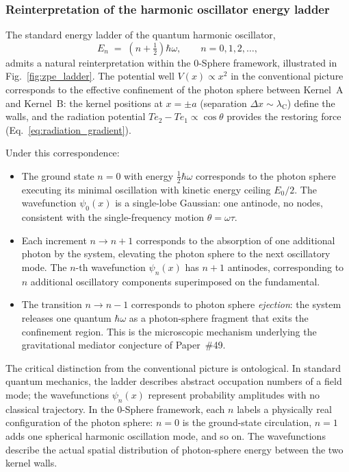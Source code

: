 \documentclass[%
 reprint,
 amsmath,amssymb,
 aps,
 prb,
]{revtex4-2}
\numberwithin{equation}{section}
\theoremstyle{definition}
\theoremstyle{remark}
\newcommand{\lambdaC}{\lambda_{\text{C}}}  %
\begin{document}
\subsubsection{Reinterpretation of the harmonic oscillator energy ladder}

The standard energy ladder of the quantum harmonic oscillator,
\begin{equation}
E_n \;=\; \left(n + \tfrac{1}{2}\right)\hbar\omega, \qquad n = 0, 1, 2, \ldots,
\label{eq:energy_ladder}
\end{equation}
admits a natural reinterpretation within the 0-Sphere framework, illustrated in Fig.~\ref{fig:zpe_ladder}. The potential well $V(x) \propto x^2$ in the conventional picture corresponds to the effective confinement of the photon sphere between Kernel~A and Kernel~B: the kernel positions at $x = \pm a$ (separation $\Delta x \sim \lambdaC$) define the walls, and the radiation potential $Te_2 - Te_1 \propto \cos\theta$ provides the restoring force (Eq.~\ref{eq:radiation_gradient}).

Under this correspondence:
\begin{itemize}
\item The ground state $n = 0$ with energy $\frac{1}{2}\hbar\omega$ corresponds to the photon sphere executing its minimal oscillation with kinetic energy ceiling $E_0/2$. The wavefunction $\psi_0(x)$ is a single-lobe Gaussian: one antinode, no nodes, consistent with the single-frequency motion $\theta = \omega\tau$.
\item Each increment $n \to n+1$ corresponds to the absorption of one additional photon by the system, elevating the photon sphere to the next oscillatory mode. The $n$-th wavefunction $\psi_n(x)$ has $n+1$ antinodes, corresponding to $n$ additional oscillatory components superimposed on the fundamental.
\item The transition $n \to n-1$ corresponds to photon sphere \emph{ejection}: the system releases one quantum $\hbar\omega$ as a photon-sphere fragment that exits the confinement region. This is the microscopic mechanism underlying the gravitational mediator conjecture of Paper~\#49.
\end{itemize}

The critical distinction from the conventional picture is ontological. In standard quantum mechanics, the ladder describes abstract occupation numbers of a field mode; the wavefunctions $\psi_n(x)$ represent probability amplitudes with no classical trajectory. In the 0-Sphere framework, each $n$ labels a physically real configuration of the photon sphere: $n=0$ is the ground-state circulation, $n=1$ adds one spherical harmonic oscillation mode, and so on. The wavefunctions describe the actual spatial distribution of photon-sphere energy between the two kernel walls.
\end{document}
